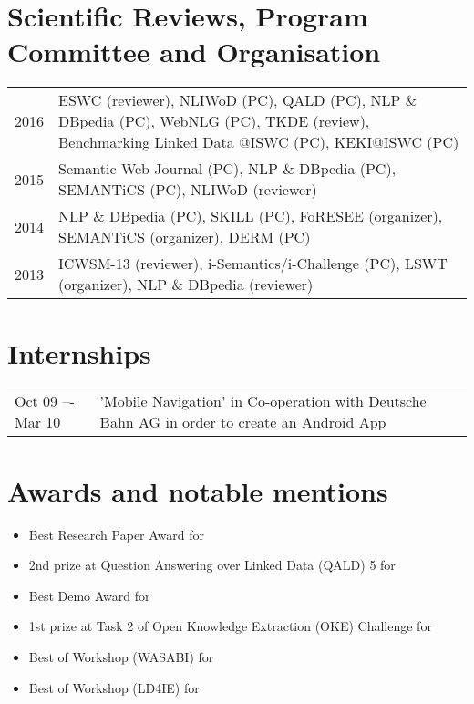 \section*{Scientific Reviews, Program Committee and Organisation}
\begin{tabular}{p{3cm}p{10cm}}	
2016        & ESWC (reviewer), NLIWoD (PC), QALD (PC), NLP \& DBpedia (PC), WebNLG (PC), TKDE (review), Benchmarking Linked Data @ISWC (PC), KEKI@ISWC (PC) \\
2015        & Semantic Web Journal (PC), NLP \& DBpedia (PC), SEMANTiCS (PC), NLIWoD (reviewer)\\
2014		& NLP \& DBpedia (PC), SKILL (PC), FoRESEE (organizer), SEMANTiCS  (organizer), DERM (PC)\\
2013		& ICWSM-13 (reviewer), i-Semantics/i-Challenge (PC), LSWT (organizer), NLP \& DBpedia (reviewer)\\
\end{tabular}

\section*{Internships}
\begin{tabular}{p{3cm}p{10cm}}	
Oct 09 –- Mar 10		& 	'Mobile Navigation' in Co-operation with Deutsche Bahn AG in order to create an Android App\\
\end{tabular}

\section*{Awards and notable mentions}
\begin{itemize}
    \item {Best Research Paper Award}  for  
    \item {2nd prize at Question Answering over Linked Data (QALD) 5} for   
    \item {Best Demo Award} for  
    \item {1st prize at Task 2 of Open Knowledge Extraction (OKE) Challenge}  for 
    \item {Best of Workshop (WASABI)}  for 
    \item {Best of Workshop (LD4IE)} for 
\end{itemize}